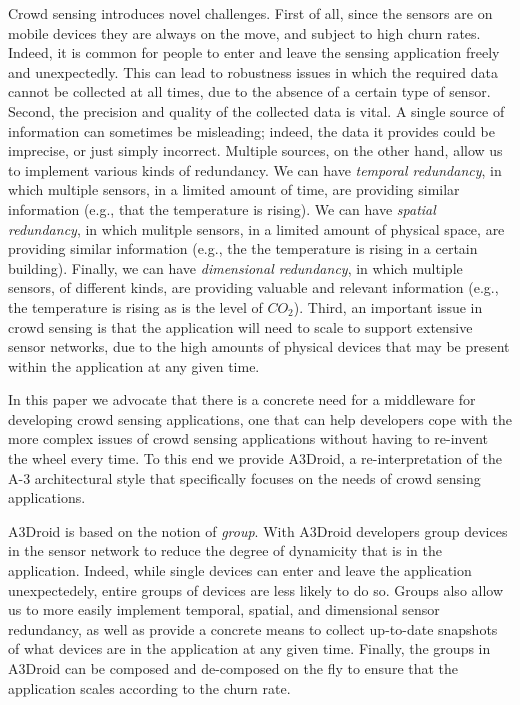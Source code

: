 Crowd sensing introduces novel challenges. First of all, since the sensors are on mobile devices they are always on the move, and subject to high churn rates. Indeed, it is common for people to enter and leave the sensing application freely and unexpectedly. This can lead to robustness issues in which the required data cannot be collected at all times, due to the absence of a certain type of sensor. Second, the precision and quality of the collected data is vital. A single source of information can sometimes be misleading; indeed, the data it provides could be imprecise, or just simply incorrect. Multiple sources, on the other hand, allow us to implement various kinds of redundancy. We can have \emph{temporal redundancy}, in which multiple sensors, in a limited amount of time, are providing similar information  (e.g., that the temperature is rising). We can have \emph{spatial redundancy}, in which mulitple sensors, in a limited amount of physical space, are providing similar information (e.g., the the temperature is rising in a certain building). Finally, we can have \emph{dimensional redundancy}, in which multiple sensors, of different kinds, are providing valuable and relevant information (e.g., the temperature is rising as is the level of $CO_{2}$). Third, an important issue in crowd sensing is that the application will need to scale to support extensive sensor networks, due to the high amounts of physical devices that may be present within the application at any given time.

In this paper we advocate that there is a concrete need for a middleware for developing crowd sensing applications, one that can help developers cope with the more complex issues of crowd sensing applications without having to re-invent the wheel every time. To this end we provide A3Droid, a re-interpretation of the A-3 architectural style that specifically focuses on the needs of crowd sensing applications. 

A3Droid is based on the notion of \emph{group}. With A3Droid developers group devices in the sensor network to reduce the degree of dynamicity that is in the application. Indeed, while single devices can enter and leave the application unexpectedely, entire groups of devices are less likely to do so. Groups also allow us to more easily implement temporal, spatial, and dimensional sensor redundancy, as well as provide a concrete means to collect up-to-date snapshots of what devices are in the application at any given time. Finally, the groups in A3Droid can be composed and de-composed on the fly to ensure that the application scales according to the churn rate. 

